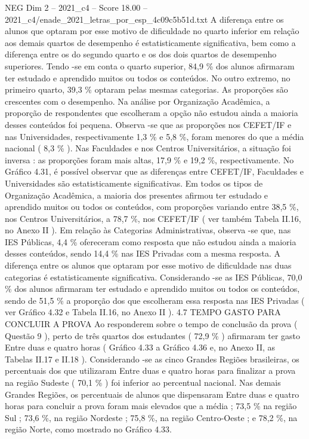 \begin{textsample}{NEG Dim 2 – 2021\_c4 – Score 18.00 – 2021\_c4/enade\_2021\_letras\_por\_esp\_4c09c5b51d.txt}
A diferença entre os alunos que optaram por esse motivo de dificuldade no quarto inferior em relação aos demais quartos de desempenho é estatisticamente significativa, bem como a diferença entre os do segundo quarto e os dos dois quartos de desempenho superiores.
Tendo -se em conta o quarto superior, 84,9 \% dos alunos afirmaram ter estudado e aprendido muitos ou todos os conteúdos.
No outro extremo, no primeiro quarto, 39,3 \% optaram pelas mesmas categorias.
As proporções são crescentes com o desempenho.
Na análise por Organização Acadêmica, a proporção de respondentes que escolheram a opção não estudou ainda a maioria desses conteúdos foi pequena.
Observa -se que as proporções nos CEFET/IF e nas Universidades, respectivamente 1,3 \% e 5,8 \%, foram menores do que a média nacional ( 8,3 \% ).
Nas Faculdades e nos Centros Universitários, a situação foi inversa : as proporções foram mais altas, 17,9 \% e 19,2 \%, respectivamente.
No Gráfico 4.31, é possível observar que as diferenças entre CEFET/IF, Faculdades e Universidades são estatisticamente significativas.
Em todos os tipos de Organização Acadêmica, a maioria dos presentes afirmou ter estudado e aprendido muitos ou todos os conteúdos, com proporções variando entre 38,5 \%, nos Centros Universitários, a 78,7 \%, nos CEFET/IF ( ver também Tabela II.16, no Anexo II ).
Em relação às Categorias Administrativas, observa -se que, nas IES Públicas, 4,4 \% ofereceram como resposta que não estudou ainda a maioria desses conteúdos, sendo 14,4 \% nas IES Privadas com a mesma resposta.
A diferença entre os alunos que optaram por esse motivo de dificuldade nas duas categorias é estatisticamente significativa.
Considerando -se as IES Públicas, 70,0 \% dos alunos afirmaram ter estudado e aprendido muitos ou todos os conteúdos, sendo de 51,5 \% a proporção dos que escolheram essa resposta nas IES Privadas ( ver Gráfico 4.32 e Tabela II.16, no Anexo II ). 4.7 TEMPO GASTO PARA CONCLUIR A PROVA Ao responderem sobre o tempo de conclusão da prova ( Questão 9 ), perto de três quartos dos estudantes ( 72,9 \% ) afirmaram ter gasto Entre duas e quatro horas ( Gráfico 4.33 a Gráfico 4.36 e, no Anexo II, as Tabelas II.17 e II.18 ).
Considerando -se as cinco Grandes Regiões brasileiras, os percentuais dos que utilizaram Entre duas e quatro horas para finalizar a prova na região Sudeste ( 70,1 \% ) foi inferior ao percentual nacional.
Nas demais Grandes Regiões, os percentuais de alunos que dispensaram Entre duas e quatro horas para concluir a prova foram mais elevados que a média ; 73,5 \% na região Sul ; 73,6 \%, na região Nordeste ; 75,8 \%, na região Centro-Oeste ; e 78,2 \%, na região Norte, como mostrado no Gráfico 4.33.

\end{textsample}
